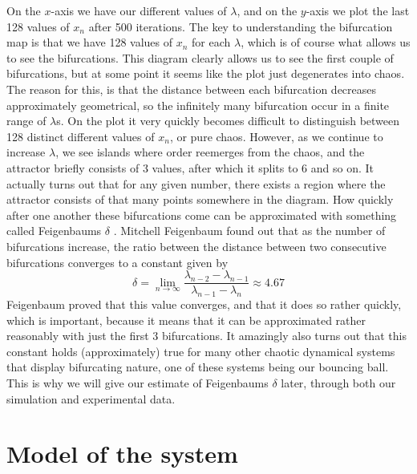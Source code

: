 \documentclass[12pt,oneside,a4paper]{article}
\numberwithin{equation}{section}
\begin{document}
{{{{On the $x$-axis we have our different values of $\lambda$, and on the $y$-axis we plot the last 128 values of $x_n$ after 500 iterations. The key to understanding the bifurcation map is that we have 128 values of $x_n$ for each $\lambda$, which is of course what allows us to see the bifurcations. This diagram clearly allows us to see the first couple of bifurcations, but at some point it seems like the plot just degenerates into chaos. The reason for this, is that the distance between each bifurcation decreases approximately geometrical, so the infinitely many bifurcation occur in a finite range of $\lambda$s. On the plot it very quickly becomes difficult to distinguish between 128 distinct different values of $x_n$, or pure chaos. However, as we continue to increase $\lambda$, we see islands where order reemerges from the chaos, and the attractor briefly consists of 3 values, after which it splits to 6 and so on. It actually turns out that for any given number, there exists a region where the attractor consists of that many points somewhere in the diagram. How quickly after one another these bifurcations come can be approximated with something called Feigenbaums $\delta$ \cite{strogatz}. Mitchell Feigenbaum found out that as the number of bifurcations increase, the ratio between the distance between two consecutive bifurcations converges to a constant given by
\begin{equation}
\delta=\lim_{n \to \infty} \frac{\lambda_{n-2} - \lambda_{n-1}}{\lambda_{n-1}-\lambda_n} \approx 4.67 \label{Feigenbaumsdelta}
\end{equation}
Feigenbaum proved that this value converges, and that it does so rather quickly, which is important, because it means that it can be approximated rather reasonably with just the first 3 bifurcations. It amazingly also turns out that this constant holds (approximately) true for many other chaotic dynamical systems that display bifurcating nature, one of these systems being our bouncing ball. This is why we will give our estimate of Feigenbaums $\delta$ later, through both our simulation and experimental data.
\section{Model of the system}
\label{modelling}
}}}}
\end{document}
